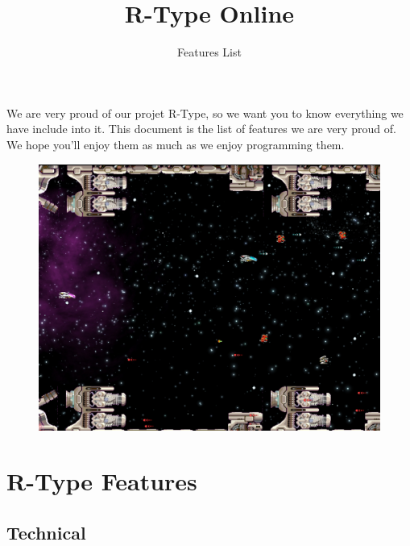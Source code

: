 \documentclass{koala-fr}
\begin{document}
\title{R-Type Online}
\subtitle{Features List}

\summary
{
  We are very proud of our projet R-Type, so we want you to know everything we have include into it. This document is the list of features we are very proud of. We hope you'll enjoy them as much as we enjoy programming them.
  \begin{figure}[H]
    \begin{center}
      \includegraphics[width=14cm]{game.jpg}
    \end{center}
  \end{figure}
}

\maketitle

\tableofcontents

\chapter{R-Type Features}

\section{Technical}
\end{document}
